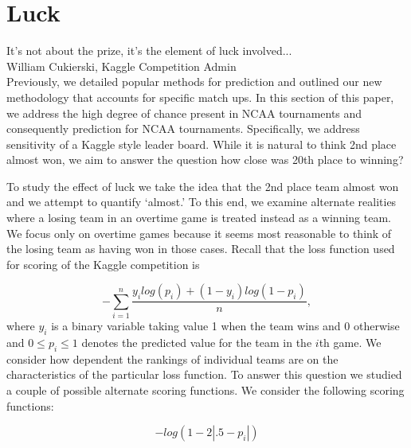 
\section{Luck}
\noindent It's not about the prize, it's the element of luck involved...\\
\noindent  William Cukierski, Kaggle Competition Admin \\

Previously, we detailed popular methods for prediction and outlined our new methodology that accounts for specific match ups. In this section of this paper, we address the high degree of chance present in NCAA tournaments and consequently prediction for NCAA tournaments.  Specifically, we address sensitivity of a Kaggle style leader board. While it is natural to think 2nd place almost won, we aim to answer the question how close was 20th place to winning? 


To study the effect of luck we take the idea that the 2nd place team almost won and we attempt to quantify `almost.' To this end, we examine alternate realities where a losing team in an overtime game is treated instead as a winning team. We focus only on overtime games because it seems most reasonable to think of the losing team as having won in those cases. Recall that the loss function used for scoring of the Kaggle competition is

\begin{equation}\label{eqn:kaggle_score}
-\sum_{i=1}^n\frac{y_ilog(p_i)+ (1-y_i)log(1-p_i)}{n},
\end{equation}
where $y_i$ is a binary variable taking value 1 when the team wins and 0 otherwise and $0 \leq p_i \leq 1$ denotes the predicted value for the team in the $i$th game. We consider how dependent the rankings of individual teams are on the characteristics of the particular loss function. To answer this question we studied a couple of possible alternate scoring functions. We consider the following scoring functions: 
 
\begin{equation}\label{eqn:first_score_function}
-log(1-2|.5-p_i|)
\end{equation} 

